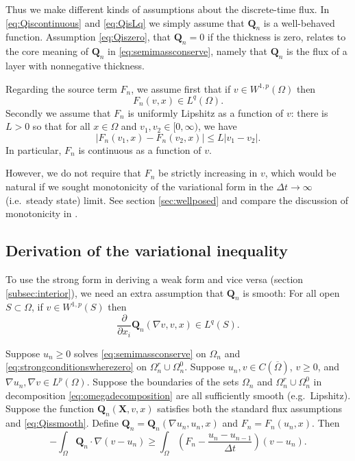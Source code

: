 \documentclass[final,leqno,onefignum,onetabnum]{siamltex1213bueler}
\newcommand\bQ{\mathbf{Q}}
\newcommand\bX{\mathbf{X}}
\renewcommand{\grad}{\nabla}
\begin{document}
Thus we make different kinds of assumptions about the discrete-time flux.  In \eqref{eq:Qiscontinuous} and \eqref{eq:QisLq} we simply assume that $\bQ_n$ is a well-behaved function.  Assumption \eqref{eq:Qiszero}, that $\bQ_n=0$ if the thickness is zero, relates to the core meaning of $\bQ_n$ in \eqref{eq:semimassconserve}, namely that $\bQ_n$ is the flux of a layer with nonnegative thickness.  

Regarding the source term $F_n$, we assume first that if $v\in W^{1,p}(\Omega)$ then
\begin{equation}
F_n(v,x) \in L^q(\Omega).  \label{eq:FisLq}
\end{equation}
Secondly we assume that $F_n$ is uniformly Lipshitz as a function of $v$: there is $L>0$ so that for all $x\in\Omega$ and $v_1,v_2 \in [0,\infty)$, we have
\begin{equation}
\left|F_n(v_1,x)-F_n(v_2,x)\right| \le L |v_1-v_2|.  \label{eq:Fislip}
\end{equation}
In particular, $F_n$ is continuous as a function of $v$.

However, we do not require that $F_n$ be strictly increasing in $v$, which would be natural if we sought monotonicity of the variational form in the $\Delta t \to \infty$ (i.e.~steady state) limit.  See section \ref{sec:wellposed} and compare the discussion of monotonicity in  \cite{JouvetBueler2012}.

\subsection{Derivation of the variational inequality}  \label{subsec:derivevi}  To use the strong form in deriving a weak form and vice versa (section \ref{subsec:interior}), we need an extra assumption that $\bQ_n$ is smooth:  For all open $S \subset \Omega$, if $v\in W^{1,p}(S)$ then
\begin{equation}
\frac{\partial}{\partial x_i} \bQ_n(\grad v,v,x) \in L^q(S). \label{eq:Qissmooth}
\end{equation}

\medskip
\begin{theorem} \label{thm:strongimpliesweak}  Suppose $u_n\ge 0$ solves \eqref{eq:semimassconserve} on $\Omega_n$ and \eqref{eq:strongconditionswherezero} on $\Omega_n^r \cup \Omega_n^0$.  Suppose $u_n,v\in C(\overline{\Omega})$, $v\ge 0$, and $\grad u_n,\grad v \in L^p(\Omega)$.  Suppose the boundaries of the sets $\Omega_n$ and $\Omega_n^r \cup \Omega_n^0$ in decomposition \eqref{eq:omegadecomposition} are all sufficiently smooth (e.g.~Lipshitz).  Suppose the function $\bQ_n(\bX,v,x)$ satisfies both the standard flux assumptions and \eqref{eq:Qissmooth}.  Define $\bQ_n=\bQ_n(\grad u_n,u_n,x)$ and $F_n = F_n(u_n,x)$.  Then
\begin{equation}
-\int_{\Omega} \bQ_n \cdot \grad(v-u_n) \ge \int_{\Omega} \left(F_n - \frac{u_n - u_{n-1}}{\Delta t}\right) (v-u_n). \label{eq:morallytheVI}
\end{equation}
\end{theorem}
\end{document}

